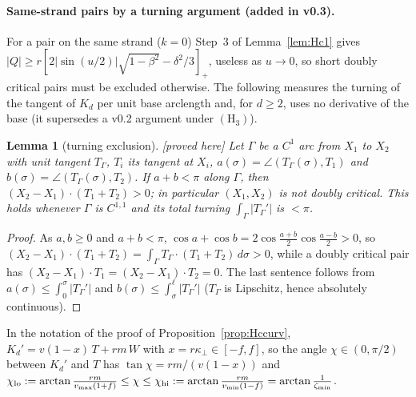 \documentclass[10pt,a4paper]{article}
\theoremstyle{plain}
\newtheorem{lemma}[theorem]{Lemma}
\theoremstyle{definition}
\theoremstyle{remark}
\newcommand{\status}[1]{\textsf{\small [#1]}}
\begin{document}
\paragraph{Same-strand pairs by a turning argument (added in v0.3).} For a pair on the same strand ($k=0$) Step~3 of Lemma~\ref{lem:Hc1} gives $|Q|\ge r[2|\sin(u/2)|\sqrt{1-\beta^2}-\delta^2/3]_+$, useless as $u\to0$, so short doubly critical pairs must be excluded otherwise. The following measures the turning of the tangent of $K_d$ per unit base arclength and, for $d\ge2$, uses no derivative of the base (it supersedes a v0.2 argument under $(\mathrm H_3)$).

\begin{lemma}[turning exclusion]\label{lem:turn}\status{proved here}
Let $\Gamma$ be a $C^1$ arc from $X_1$ to $X_2$ with unit tangent $T_\Gamma$, $T_i$ its tangent at $X_i$, $a(\sigma)=\angle(T_\Gamma(\sigma),T_1)$ and $b(\sigma)=\angle(T_\Gamma(\sigma),T_2)$. If $a+b<\pi$ along $\Gamma$, then $(X_2-X_1)\cdot(T_1+T_2)>0$; in particular $(X_1,X_2)$ is not doubly critical. This holds whenever $\Gamma$ is $C^{1,1}$ and its total turning $\int_\Gamma|T_\Gamma'|$ is $<\pi$.
\end{lemma}
\begin{proof}
As $a,b\ge0$ and $a+b<\pi$, $\cos a+\cos b=2\cos\frac{a+b}2\cos\frac{a-b}2>0$, so $(X_2-X_1)\cdot(T_1+T_2)=\int_\Gamma T_\Gamma\cdot(T_1+T_2)\,d\sigma>0$, while a doubly critical pair has $(X_2-X_1)\cdot T_1=(X_2-X_1)\cdot T_2=0$. The last sentence follows from $a(\sigma)\le\int_0^\sigma|T_\Gamma'|$ and $b(\sigma)\le\int_\sigma^{\ell}|T_\Gamma'|$ ($T_\Gamma$ is Lipschitz, hence absolutely continuous).
\end{proof}

In the notation of the proof of Proposition~\ref{prop:Hccurv}, $K_d'=v(1-x)\,T+rm\,W$ with $x=r\kappa_\perp\in[-f,f]$, so the angle $\chi\in(0,\pi/2)$ between $K_d'$ and $T$ has $\tan\chi=rm/(v(1-x))$ and $\chi_{\rm lo}:=\arctan\frac{rm}{v_{\max}(1+f)}\le\chi\le\chi_{\rm hi}:=\arctan\frac{rm}{v_{\min}(1-f)}=\arctan\frac1{\zeta_{\min}}$.
\end{document}
